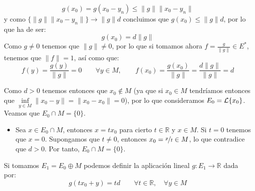 \documentclass[12pt]{article}
\begin{document}
\begin{ejercicio}[3.5 Puntos]
\begin{description}
\begin{equation*}
                    g(x_0) = g(x_0 - y_n) \leq \|g\|\|x_0 - y_n\|
                \end{equation*}
                y como $\{\|g\|\|x_0-y_n\|\}\to \|g\|d$ concluimos que $g(x_0)\leq \|g\|d$, por lo que ha de ser:
                \begin{equation*}
                    g(x_0) = d\|g\|
                \end{equation*}
                Como $g\neq 0$ tenemos que $\|g\|\neq 0$, por lo que si tomamos ahora $f = \frac{g}{\|g\|}\in E^\ast$, tenemos que $\|f\| = 1$, así como que:
                \begin{equation*}
                    f(y) = \frac{g(y)}{\|g\|} = 0 \qquad \forall y\in M, \qquad 
                    f(x_0) = \frac{g(x_0)}{\|g\|} = \frac{d\|g\|}{\|g\|} = d
                \end{equation*}
            \item [Opción 2.] Como $d>0$ tenemos entonces que $x_0\notin M$ (ya que si $x_0\in M$ tendríamos entonces que $\inf\limits_{y\in M}\|x_0-y\| = \|x_0-x_0\| = 0$), por lo que consideramos $E_0=\mathcal{L}\{x_0\}$. Veamos que $E_0\cap M = \{0\}$.
                \begin{itemize}
                    \item Sea $x\in E_0\cap M$, entonces $x = tx_0$ para cierto $t\in \mathbb{R}$ y $x\in M$. Si $t=0$ tenemos que $x=0$. Supongamos que $t\neq 0$, entonces $x_0 = \nicefrac{x}{t}\in M$, lo que contradice que $d>0$. Por tanto, $E_0\cap M = \{0\}$.
                \end{itemize}
            
            
                Si tomamos $E_1 = E_0\oplus M$ podemos definir la aplicación lineal $g:E_1\to \mathbb{R}$ dada por:
                \begin{equation*}
                    g(tx_0 + y) = td \qquad \forall t\in \mathbb{R}, \quad \forall y\in M
                \end{equation*}


\end{description}
\end{ejercicio}
\end{document}
